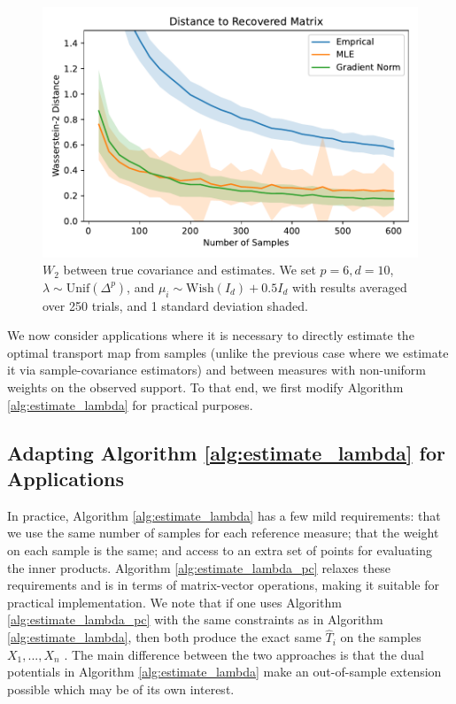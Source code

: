 \documentclass[nohyperref]{article}
\theoremstyle{definition}
\begin{document}
\begin{figure}[ht!]
    \centering
    \includegraphics[width=0.93\linewidth]{figures/gaussian.pdf}
    \caption{$W_{2}$ between true covariance and estimates.  We set $p = 6, d = 10$, $\lambda \sim \text{Unif}(\Delta^p)$, and $\mu_i \sim \text{Wish}(I_d) + 0.5 I_d$ with results averaged over 250 trials, and 1 standard deviation shaded.}
    \label{fig:gaussian}
\end{figure}

We now consider applications where it is necessary to directly estimate the optimal transport map from samples (unlike the previous case where we estimate it via sample-covariance estimators) and between measures with non-uniform weights on the observed support. To that end, we first modify Algorithm \ref{alg:estimate_lambda} for practical purposes.

\subsection{Adapting Algorithm \ref{alg:estimate_lambda} for Applications}
In practice, Algorithm \ref{alg:estimate_lambda} has a few mild requirements: that we use the same number of samples for each reference measure; that the weight on each sample is the same; and access to an extra set of points for evaluating the inner products. Algorithm \ref{alg:estimate_lambda_pc} relaxes these requirements and is in terms of matrix-vector operations, making it suitable for practical implementation. We note that if one uses Algorithm \ref{alg:estimate_lambda_pc} with the same constraints as in Algorithm \ref{alg:estimate_lambda}, then both produce the exact same $\hat{T}_i$ on the samples $X_1,...,X_n$ \cite{pooladian2021entropic}. The main difference between the two approaches is that the dual potentials in Algorithm \ref{alg:estimate_lambda} make an out-of-sample extension possible which may be of its own interest. 
\end{document}
